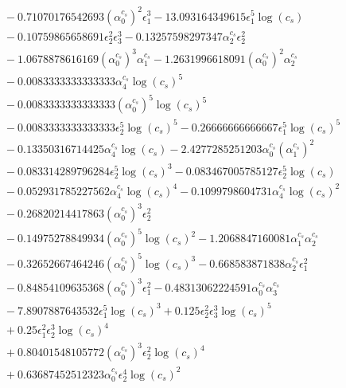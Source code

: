 \documentclass[10pt]{article}
\begin{document}
\begin{align*}
&{}  - 0.71070176542693 \left(\alpha_{0}^{c_s}\right)^{2} \epsilon_{1}^{3} - 13.093164349615 \epsilon_{1}^{5} \log{\left(c_{s} \right)} \\
&{}  - 0.10759865658691 \epsilon_{2}^{2} \epsilon_{3}^{3} - 0.13257598297347 \alpha_{2}^{c_s} \epsilon_{2}^{2} \\
&{}  - 1.0678878616169 \left(\alpha_{0}^{c_s}\right)^{3} \alpha_{1}^{c_s} - 1.2631996618091 \left(\alpha_{0}^{c_s}\right)^{2} \alpha_{2}^{c_s} \\
&{}  - 0.0083333333333333 \alpha_{4}^{c_s} \log{\left(c_{s} \right)}^{5} \\
&{}  - 0.0083333333333333 \left(\alpha_{0}^{c_s}\right)^{5} \log{\left(c_{s} \right)}^{5} \\
&{}  - 0.0083333333333333 \epsilon_{2}^{5} \log{\left(c_{s} \right)}^{5} - 0.26666666666667 \epsilon_{1}^{5} \log{\left(c_{s} \right)}^{5} \\
&{}  - 0.13350316714425 \alpha_{4}^{c_s} \log{\left(c_{s} \right)} - 2.4277285251203 \alpha_{0}^{c_s} \left(\alpha_{1}^{c_s}\right)^{2} \\
&{}  - 0.083314289796284 \epsilon_{2}^{5} \log{\left(c_{s} \right)}^{3} - 0.083467005785127 \epsilon_{2}^{5} \log{\left(c_{s} \right)} \\
&{}  - 0.052931785227562 \alpha_{4}^{c_s} \log{\left(c_{s} \right)}^{4} - 0.1099798604731 \alpha_{4}^{c_s} \log{\left(c_{s} \right)}^{2} \\
&{}  - 0.26820214417863 \left(\alpha_{0}^{c_s}\right)^{3} \epsilon_{2}^{2} \\
&{}  - 0.14975278849934 \left(\alpha_{0}^{c_s}\right)^{5} \log{\left(c_{s} \right)}^{2} - 1.2068847160081 \alpha_{1}^{c_s} \alpha_{2}^{c_s} \\
&{}  - 0.32652667464246 \left(\alpha_{0}^{c_s}\right)^{5} \log{\left(c_{s} \right)}^{3} - 0.668583871838 \alpha_{2}^{c_s} \epsilon_{1}^{2} \\
&{}  - 0.84854109635368 \left(\alpha_{0}^{c_s}\right)^{3} \epsilon_{1}^{2} - 0.48313062224591 \alpha_{0}^{c_s} \alpha_{3}^{c_s} \\
&{}  - 7.8907887643532 \epsilon_{1}^{5} \log{\left(c_{s} \right)}^{3} + 0.125 \epsilon_{2}^{2} \epsilon_{3}^{3} \log{\left(c_{s} \right)}^{5} \\
&{}  + 0.25 \epsilon_{1}^{2} \epsilon_{2}^{3} \log{\left(c_{s} \right)}^{4} \\
&{}  + 0.80401548105772 \left(\alpha_{0}^{c_s}\right)^{3} \epsilon_{2}^{2} \log{\left(c_{s} \right)}^{4} \\
&{}  + 0.63687452512323 \alpha_{0}^{c_s} \epsilon_{2}^{4} \log{\left(c_{s} \right)}^{2} \\

\end{align*}
\end{document}
